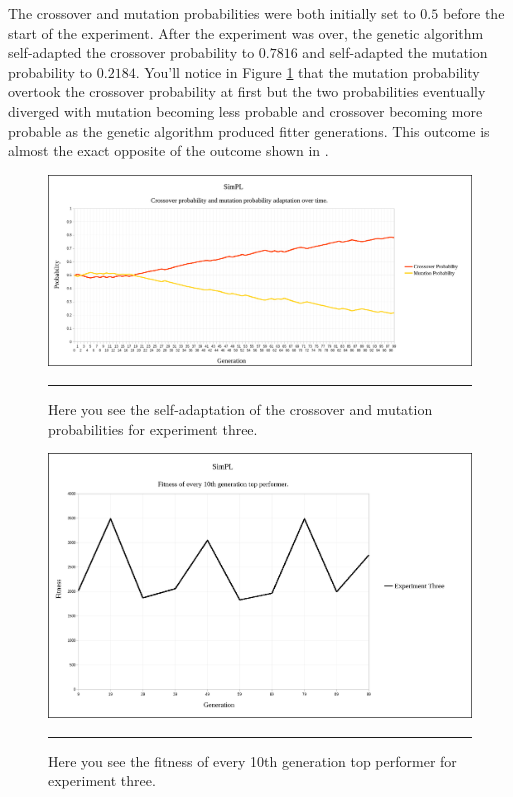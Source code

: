 The crossover and mutation probabilities were both initially set to $0.5$ before the start of the experiment. After the experiment was over, the genetic algorithm self-adapted the crossover probability to $0.7816$ and self-adapted the mutation probability to $0.2184$. You'll notice in Figure \ref{fig:exp3_self_adapt} that the mutation probability overtook the crossover probability at first but the two probabilities eventually diverged with mutation becoming less probable and crossover becoming more probable as the genetic algorithm produced fitter generations. This outcome is almost the exact opposite of the outcome shown in \cite{self_adapt}.

\begin{figure}[htbp]  
  \centering
  \includegraphics[width=5in]{../Figures/Chapter3/exp3_self_adapt.png}
  \rule{35em}{0.5pt}
  \caption[Experiment Three Self-adaptation]{Here you see the self-adaptation of the crossover and mutation probabilities for experiment three.}
  \label{fig:exp3_self_adapt}
\end{figure}

\begin{figure}[htbp]  
  \centering
  \includegraphics[width=5in]{../Figures/Chapter3/exp3_10_tops.png}
  \rule{35em}{0.5pt}
  \caption[Experiment Three Top Performers]{Here you see the fitness of every 10th generation top performer for experiment three.}
  \label{fig:exp3_10_tops}
\end{figure}

